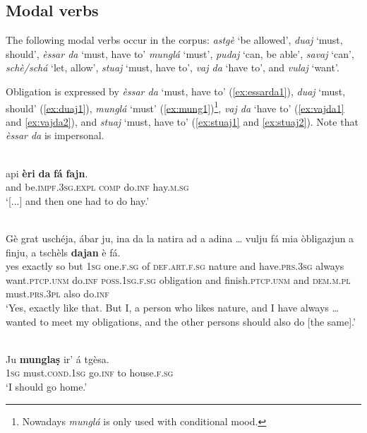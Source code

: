 \subsection{Modal verbs}
The following modal verbs occur in the corpus: \textit{astgè} `be allowed', \textit{duaj} `must, should', \textit{èssar da} `must, have to' \textit{munglá} `must', \textit{pudaj} `can, be able', \textit{savaj} `can', \textit{schè/schá} `let, allow', \textit{stuaj} `must, have to', \textit{vaj da} `have to', and \textit{vulaj} `want'.

Obligation is expressed by \textit{èssar da} `must, have to' (\ref{ex:essarda1}), \textit{duaj} `must, should' (\ref{ex:duaj1}), \textit{munglá} `must' (\ref{ex:mung1})\footnote{Nowadays \textit{munglá} is only used with conditional mood.}, \textit{vaj da} `have to' (\ref{ex:vajda1} and \ref{ex:vajda2}), and \textit{stuaj} `must, have to' (\ref{ex:stuaj1} and \ref{ex:stuaj2}). Note that \textit{èssar da} is impersonal.

\ea
\label{ex:essarda1}
\\
	\gll [...] api \textbf{èri} \textbf{da} \textbf{fá} \textbf{fajn}.\\
{} and be.\textsc{impf.3sg.expl} \textsc{comp} do.\textsc{inf} hay.\textsc{m.sg}\\
\glt `[...] and then one had to do hay.'
\z

\ea
\label{ex:duaj1}
\\
\gll Gè grat uschéja, ábar ju, ina da la natira ad a adina … vulju fá mia òbligazjun a finju, a tschèls \textbf{dajan} è fá.\\
yes exactly so but \textsc{1sg} one.\textsc{f.sg} of \textsc{def.art.f.sg} nature and have.\textsc{prs.3sg} always {} want.\textsc{ptcp.unm} do.\textsc{inf} \textsc{poss.1sg.f.sg} obligation and finish.\textsc{ptcp.unm} and \textsc{dem.m.pl} must.\textsc{prs.3pl} also do.\textsc{inf}\\
\glt `Yes, exactly like that. But I, a person who likes nature, and I have always … wanted to meet my obligations, and the other persons should also do [the same].'
\z

\ea\label{ex:mung1}
\\
\gll  Ju \textbf{munglaṣ} ir' á tgèsa.\\
\textsc{1sg}  must.\textsc{cond.1sg} go.\textsc{inf} to house.\textsc{f.sg} \\
\glt `I should go home.'
\z

